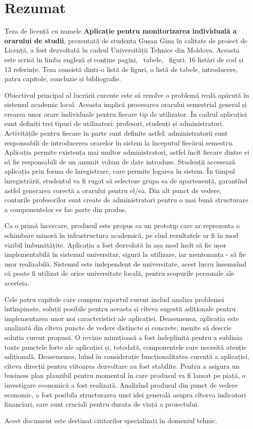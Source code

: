 \section*{Rezumat}
Teza de licență cu numele \textbf{Aplicație pentru monitorizarea individuală a orarului de studii}, prezentată de studenta Gușan Gina în calitate de proiect de Licență, a fost dezvoltată în cadrul Universității Tehnice din Moldova. Aceasta este scrisă în limba engleză și conține  \pageref{LastPage} pagini, \totaltables\ tabele, \totalfigures\ figuri, 16 listări de cod și 13 referințe. Teza consistă dintr-o listă de figuri, o listă de tabele, introducere, patru capitole, concluzie și bibliografie.

Obiectivul principal al lucrării curente este să rezolve o problemă reală apărută în sistemul academic local. Aceasta implică procesarea orarului semestrial general și crearea unor orare individuale pentru fiecare tip de utilizator. În cadrul aplicației sunt definiți trei tipuri de utilizatori: profesori, studenți și administratori. Activitățile pentru fiecare în parte sunt definite astfel: administratorii sunt responsabili de introducerea orarelor în sistem la începutul fiecărui semestru. Aplicația permite existența mai multor administratori, astfel încît fiecare dintre ei să fie responsabili de un anumit volum de date introduse. Studenții accesează aplicația prin forma de înregistrare, care permite logarea în sistem. În timpul înregistrării, studentul va fi rugat să selecteze grupa sa de apartenență, garantînd astfel generarea corectă a orarului pentru el/ea. Din alt punct de vedere, conturile profesorilor sunt create de administratori pentru o mai bună structurare a componentelor ce fac parte din produs.

Ca o primă încercare, produsul este propus ca un prototip care ar reprezenta o schimbare minoră în infrastructura academică, pe cînd rezultatele ar fi în mod vizibil îmbunătățite. Aplicația a fost dezvolată în așa mod încît să fie ușor implementabilă în sistemul universitar, sigură la utilizare, iar mentenanța - să fie ușor realizabilă. Sistemul este independent de universitate, acest lucru însemnînd că poate fi utilizat de orice universitate locală, pentru scopurile personale ale acesteia. 

Cele patru capitole care compun raportul curent includ analiza problemei întîmpinate, soluții posibile pentru aceasta și cîteva sugestii adiționale pentru implementarea unor noi caracteristici ale aplicației. Deasemenea, aplicația este analizată din cîteva puncte de vedere distincte și concrete, menite să descrie soluția curent propusă. O revizie minuțioasă a fost îndeplinită pentru a sublinia toate punctele forte ale aplicației și, totodată, componentele care necesită atenție adițională. Deasemenea, luînd în considerație funcționalitatea curentă a aplicației, cîteva direcții pentru viitoarea dezvoltare au fost stabilite. Pentru a asigura un business plan plauzibil pentru momentul în care produsul va fi lansat pe piață, o investigare economică a fost realizată. Analizînd produsul din punct de vedere economic, a fost posibila structurarea unei  idei generală asupra cîtorva indicatori financiari, care sunt cruciali pentru durata de viață a proiectului.

Acest document este destinat cititorilor specializați în domeniul tehnic.



